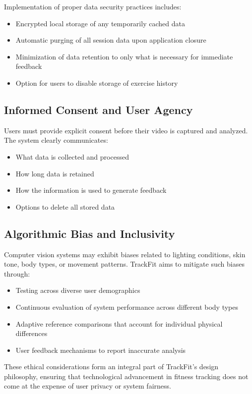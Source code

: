 \documentclass[conference]{IEEEtran}
\begin{document}
Implementation of proper data security practices includes:
\begin{itemize}
    \item Encrypted local storage of any temporarily cached data
    \item Automatic purging of all session data upon application closure
    \item Minimization of data retention to only what is necessary for immediate feedback
    \item Option for users to disable storage of exercise history
\end{itemize}

\subsection{Informed Consent and User Agency}
Users must provide explicit consent before their video is captured and analyzed. The system clearly communicates:
\begin{itemize}
    \item What data is collected and processed
    \item How long data is retained
    \item How the information is used to generate feedback
    \item Options to delete all stored data
\end{itemize}

\subsection{Algorithmic Bias and Inclusivity}
Computer vision systems may exhibit biases related to lighting conditions, skin tone, body types, or movement patterns. TrackFit aims to mitigate such biases through:
\begin{itemize}
    \item Testing across diverse user demographics
    \item Continuous evaluation of system performance across different body types
    \item Adaptive reference comparisons that account for individual physical differences
    \item User feedback mechanisms to report inaccurate analysis
\end{itemize}

These ethical considerations form an integral part of TrackFit's design philosophy, ensuring that technological advancement in fitness tracking does not come at the expense of user privacy or system fairness.
\end{document}
